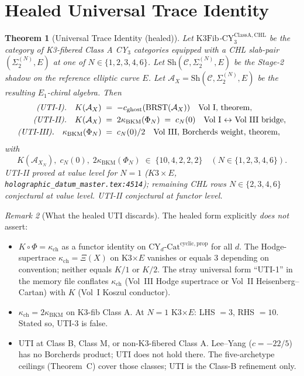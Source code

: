 \documentclass[11pt]{amsart}
\newtheorem{theorem}{Theorem}
\theoremstyle{definition}
\theoremstyle{remark}
\newtheorem{remark}[theorem]{Remark}
\newcommand{\CY}{\mathrm{CY}}
\newcommand{\Cat}{\mathrm{Cat}}
\newcommand{\kch}{\kappa_{\mathrm{ch}}}
\newcommand{\kBKM}{\kappa_{\mathrm{BKM}}}
\newcommand{\BRST}{\mathrm{BRST}}
\begin{document}
\section{Healed Universal Trace Identity}

\begin{theorem}[Universal Trace Identity (healed)]\label{thm:uti-healed}
Let $\mathrm{K3Fib}$-$\CY_3^{\mathrm{ClassA,CHL}}$ be the category of K3-fibered Class A CY$_3$
categories equipped with a CHL slab-pair $(\Sigma_2^{(N)}, E)$ at one of $N \in \{1, 2, 3, 4, 6\}$.
Let $\mathrm{Sh}(\mathcal{C}, \Sigma_2^{(N)}, E)$ be the Stage-2 shadow on the reference elliptic
curve $E$. Let $\mathcal{A}_X = \mathrm{Sh}(\mathcal{C}, \Sigma_2^{(N)}, E)$ be the resulting
$E_1$-chiral algebra. Then
\begin{align}
\text{\emph{(UTI-I).}} \quad K(\mathcal{A}_X) &\;=\; -c_{\mathrm{ghost}}(\BRST(\mathcal{A}_X))
 \quad \text{Vol I, theorem}, \\
\text{\emph{(UTI-II).}} \quad K(\mathcal{A}_X) &\;=\; 2 \kBKM(\Phi_N) \;=\; c_N(0)
 \quad \text{Vol~I $\leftrightarrow$ Vol~III bridge}, \\
\text{\emph{(UTI-III).}} \quad \kBKM(\Phi_N) &\;=\; c_N(0)/2
 \quad \text{Vol~III, Borcherds weight, theorem},
\end{align}
with
\[
K(\mathcal{A}_{X_N}), \;c_N(0), \;2\kBKM(\Phi_N) \;\in\; \{10, 4, 2, 2, 2\} \quad (N \in \{1, 2, 3, 4, 6\}).
\]
UTI-II \emph{proved} at value level for $N = 1$ ($K3 \times E$,
\texttt{holographic\_datum\_master.tex:4514}); remaining CHL rows $N \in \{2, 3, 4, 6\}$ conjectural
at value level. UTI-II conjectural at functor level.
\end{theorem}

\begin{remark}[What the healed UTI discards]
The healed form explicitly \emph{does not} assert:
\begin{itemize}
\item $K \circ \Phi = \kch$ as a functor identity on $\CY_d$-$\Cat^{\mathrm{cyclic,prop}}$ for
all $d$. The Hodge-supertrace $\kch = \Xi(X)$ on K3$\times E$ vanishes or equals $3$ depending
on convention; neither equals $K/1$ or $K/2$. The stray universal form ``UTI-1'' in the memory
file conflates $\kch$ (Vol~III Hodge supertrace or Vol~II Heisenberg--Cartan) with $K$ (Vol~I
Koszul conductor).
\item $\kch = 2 \kBKM$ on K3-fib Class A. At $N = 1$ K3$\times E$: LHS $= 3$, RHS $= 10$.
Stated so, UTI-3 is false.
\item UTI at Class B, Class M, or non-K3-fibered Class A. Lee--Yang ($c = -22/5$) has no
Borcherds product; UTI does not hold there. The five-archetype ceilings (Theorem~C) cover those
classes; UTI is the Class-B refinement only.
\end{itemize}
\end{remark}
\end{document}
